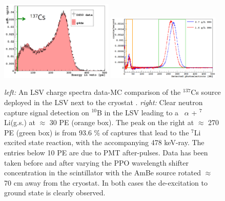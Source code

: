 \begin{figure}[htbp]
\centering
\includegraphics[width=0.48\textwidth]{./Figures/137Cs_Veto_Paolo_G4DS_UCLA}
\includegraphics[width=0.48\textwidth]{./Figures/AmBe_LSV_VetoPaper}
\caption{\textit{left:} An LSV charge spectra data-MC comparison of the $^{137}$Cs source deployed in the LSV next to the cryostat \cite{DS50:G4DS:paper}.
\textit{right:} Clear neutron capture signal detection on $^{10}$B in the LSV leading to a \enbortengroundalpha\ $\alpha$ + $^7$Li(g.s.) at $\approx$ 30 PE (orange box). The peak on the right at $\approx$ 270 PE (green box) is from 93.6 \% of captures that lead to the $^7$Li excited state reaction, with the accompanying 478 keV-ray. The entries below 10 PE are due to PMT after-pulses. Data has been taken before and after varying the PPO wavelength shifter concentration in the scintillator with the AmBe source rotated $\approx$ 70 cm away from the cryostat. In both cases the de-excitation to ground state is clearly observed.\cite{Agnes:2015qyz}
\label{fig:LSV:Calib}} 
\end{figure}